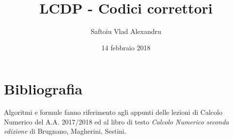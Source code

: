\documentclass{article}
\title{LCDP - Codici correttori}
\date{14 febbraio 2018}
\author{Saftoiu Vlad Alexandru}
\begin{document}
	
	\newcommand{\TODO}[1][]{
		\begin{shaded*} 
			da fare \ifthenelse{\isempty{#1}}{ }{ (: #1 ) }
		\end{shaded*}
	}
	
	\newcommand{\fek}[1]{
		\begin{equation*}
			#1
		\end{equation*}
	}

	\newcommand{\PP}[1][]{
		\ifthenelse{ \isempty{#1} }{ \\[10pt] }{ \\[#1pt] }
	}
	
	\maketitle
	\newpage

	\tableofcontents
	\newpage

	
	
	
	
	

\section*{Bibliografia}
	Algoritmi e formule fanno riferimento agli appunti delle lezioni di Calcolo Numerico del A.A. 2017/2018 ed al libro di testo \textit{Calcolo Numerico seconda edizione} di Brugnano, Magherini, Sestini.
\end{document}
